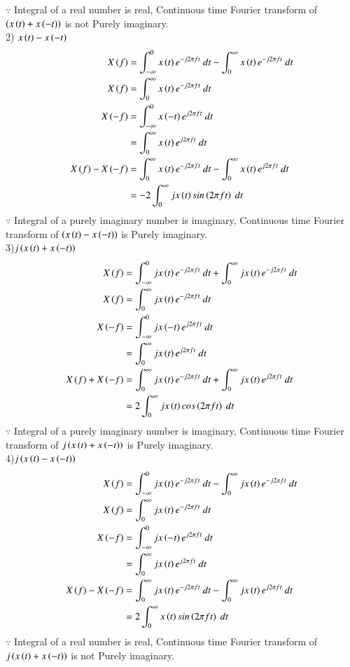 \documentclass[journal,12pt,twocolumn]{IEEEtran}
\theoremstyle{remark}
\begin{document}
$\because$ Integral of a real number is real, Continuous time Fourier transform of $\left(x\left(t\right) + x\left(-t\right)\right)$ is not Purely imaginary.\\
2) $x\left(t\right) - x\left(-t\right)$
\begin{align}
   X\brak{f}&=\int_{-\infty}^{0}x\brak{t} e^{-j2 \pi ft} \ dt-\int_{0}^{\infty}x\brak{t} e^{-j2 \pi ft} \ dt\\
   X\brak{f}&= \int_{0}^{\infty}x\brak{t} e^{-j2 \pi ft} \ dt\\
   X\brak{-f}&= \int_{-\infty}^{0}x\brak{-t} e^{j2 \pi ft} \ dt\\
 &=\int_{0}^{\infty}x\brak{t} e^{j2 \pi ft} \ dt\\
 X\brak{f}-X\brak{-f}&= \int_{0}^{\infty}x\brak{t} e^{-j2 \pi ft} \ dt-\int_{0}^{\infty}x\brak{t} e^{j2 \pi ft} \ dt\\
 &= -2 \int_{0}^{\infty}j x\brak{t} sin\brak{2 \pi ft} \ dt
\end{align}
$\because$ Integral of a purely imaginary number is imaginary, Continuous time Fourier transform of $\left(x\left(t\right) - x\left(-t\right)\right)$ is Purely imaginary.\\
3)$j\left(x\left(t\right) + x\left(-t\right)\right)$
\begin{align}
   X\brak{f}&=\int_{-\infty}^{0} j x\brak{t} e^{-j2 \pi ft} \ dt+\int_{0}^{\infty} j x\brak{t} e^{-j2 \pi ft} \ dt\\
   X\brak{f}&= \int_{0}^{\infty} j x\brak{t} e^{-j2 \pi ft} \ dt\\
   X\brak{-f}&= \int_{-\infty}^{0} j x\brak{-t} e^{j2 \pi ft} \ dt\\
 &=\int_{0}^{\infty} j x\brak{t} e^{j2 \pi ft} \ dt\\
 X\brak{f}+X\brak{-f}&= \int_{0}^{\infty} j x\brak{t} e^{-j2 \pi ft} \ dt+\int_{0}^{\infty} j x\brak{t} e^{j2 \pi ft} \ dt\\
 &= 2 \int_{0}^{\infty} j x\brak{t} cos\brak{2 \pi ft} \ dt
\end{align}
$\because$ Integral of a purely imaginary number is imaginary, Continuous time Fourier transform of $j\left(x\left(t\right) + x\left(-t\right)\right)$ is Purely imaginary.\\
4)$j\left(x\left(t\right) - x\left(-t\right)\right)$
\begin{align}
   X\brak{f}&=\int_{-\infty}^{0} j x\brak{t} e^{-j2 \pi ft} \ dt-\int_{0}^{\infty} j x\brak{t} e^{-j2 \pi ft} \ dt\\
   X\brak{f}&= \int_{0}^{\infty} j x\brak{t} e^{-j2 \pi ft} \ dt\\
   X\brak{-f}&= \int_{-\infty}^{0} j x\brak{-t} e^{j2 \pi ft} \ dt\\
 &=\int_{0}^{\infty} j x\brak{t} e^{j2 \pi ft} \ dt\\
 X\brak{f}-X\brak{-f}&= \int_{0}^{\infty} j x\brak{t} e^{-j2 \pi ft} \ dt-\int_{0}^{\infty} j x\brak{t} e^{j2 \pi ft} \ dt\\
 &= 2 \int_{0}^{\infty}  x\brak{t} sin\brak{2 \pi ft} \ dt
\end{align}
$\because$ Integral of a real number is real, Continuous time Fourier transform of $j\left(x\left(t\right) + x\left(-t\right)\right)$ is not Purely imaginary.\\
\end{document}

